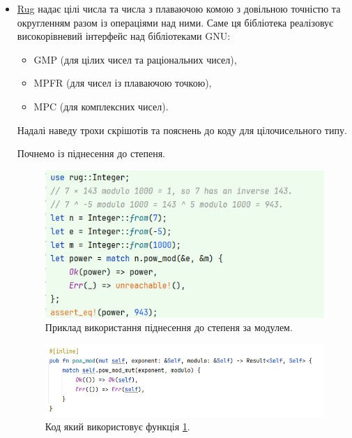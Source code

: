 \begin{itemize}
	\item \href{https://crates.io/crates/rug}{Rug} надає цілі числа та числа з плаваючою комою з довільною точністю та округленням разом із операціями над ними. Саме ця бібліотека реалізовує високорівневий інтерфейс над бібліотеками GNU:
	\begin{itemize}
		\item GMP (для цілих чисел та раціональних чисел),
		\item MPFR (для чисел із плаваючою точкою),
		\item MPC (для комплексних чисел).
	\end{itemize}
		
	Надалі наведу трохи скрішотів та пояснень до коду для цілочисельного типу.
	
	Почнемо із піднесення до степеня.
	\begin{figure}[h]
    		\centering
    		\includegraphics[scale = 0.25]{Images/pow_mod_rug}
    		\caption{Приклад використання піднесення до степеня за модулем.}
    		\label{fig:pow_mod_rug}
	\end{figure}
	
	\begin{figure}[h]
    		\centering
    		\includegraphics[scale = 0.25]{Images/pow_mod_rug_code1}
    		\caption{Код який використовує функція \ref{fig:pow_mod_rug}.}
    		\label{fig:pow_mod_rug_code1}
	\end{figure}
	

\end{itemize}
